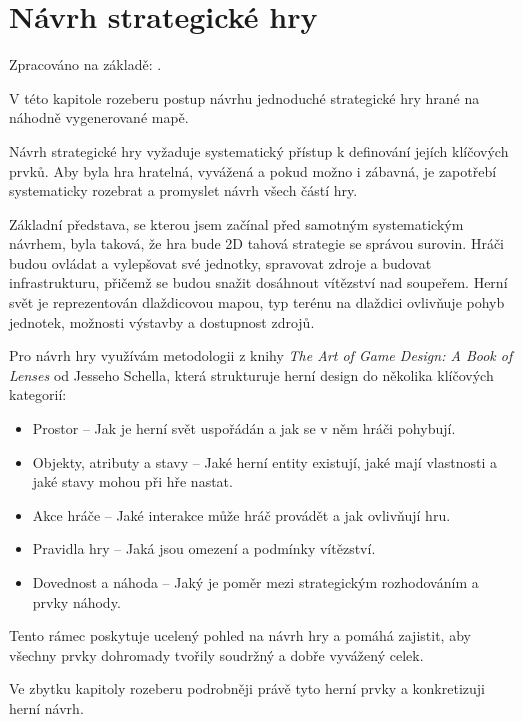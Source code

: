 \section{Návrh strategické hry}

Zpracováno na základě: \cite{navrh_lenses} \cite{navrh_rules} \cite{navrh_level}.

V této kapitole rozeberu postup návrhu jednoduché strategické hry hrané na náhodně vygenerované mapě.

Návrh strategické hry vyžaduje systematický přístup k definování jejích klíčových prvků. Aby byla hra hratelná, vyvážená a pokud možno i zábavná, je zapotřebí systematicky rozebrat a promyslet návrh všech částí hry. 

Základní představa, se kterou jsem začínal před samotným systematickým návrhem, byla taková, že hra bude 2D tahová strategie se správou surovin. Hráči budou ovládat a vylepšovat své jednotky, spravovat zdroje a budovat infrastrukturu, přičemž se budou snažit dosáhnout vítězství nad soupeřem. Herní svět je reprezentován dlaždicovou mapou, typ terénu na dlaždici ovlivňuje pohyb jednotek, možnosti výstavby a dostupnost zdrojů.

Pro návrh hry využívám metodologii z knihy \textit{The Art of Game Design: A Book of Lenses} od Jesseho Schella, která strukturuje herní design do několika klíčových kategorií:

\begin{itemize}
    \item Prostor -- Jak je herní svět uspořádán a jak se v něm hráči pohybují.
    \item Objekty, atributy a stavy -- Jaké herní entity existují, jaké mají vlastnosti a jaké stavy mohou při hře nastat.
    \item Akce hráče -- Jaké interakce může hráč provádět a jak ovlivňují hru.
    \item Pravidla hry -- Jaká jsou omezení a podmínky vítězství.
    \item Dovednost a náhoda -- Jaký je poměr mezi strategickým rozhodováním a prvky náhody.
\end{itemize}

Tento rámec poskytuje ucelený pohled na návrh hry a pomáhá zajistit, aby všechny prvky dohromady tvořily soudržný a dobře vyvážený celek.

Ve zbytku kapitoly rozeberu podrobněji právě tyto herní prvky a konkretizuji herní návrh.

